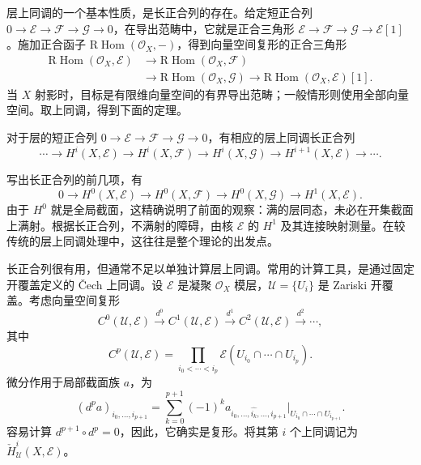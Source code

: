 层上同调的一个基本性质，是长正合列的存在。给定短正合列 $0\to\mathcal{E}\to\mathcal{F}\to\mathcal{G}\to0$，在导出范畴中，它就是正合三角形 $\mathcal{E}\to\mathcal{F}\to\mathcal{G}\to\mathcal{E}[1]$。施加正合函子 $\mathrm{R}\operatorname{Hom}(\mathcal{O}_X,-)$，得到向量空间复形的正合三角形
\[
\begin{aligned}
\mathrm{R}\operatorname{Hom}(\mathcal{O}_X,\mathcal{E})
&\longrightarrow\mathrm{R}\operatorname{Hom}(\mathcal{O}_X,\mathcal{F})\\
&\longrightarrow\mathrm{R}\operatorname{Hom}(\mathcal{O}_X,\mathcal{G})
\longrightarrow\mathrm{R}\operatorname{Hom}(\mathcal{O}_X,\mathcal{E})[1].
\end{aligned}
\]
当 $X$ 射影时，目标是有限维向量空间的有界导出范畴；一般情形则使用全部向量空间。取上同调，得到下面的定理。

\begin{theorem}\label{thm:4.62}
对于层的短正合列 $0\to\mathcal{E}\to\mathcal{F}\to\mathcal{G}\to0$，有相应的层上同调长正合列
\[
\cdots\longrightarrow H^i(X,\mathcal{E})\longrightarrow H^i(X,\mathcal{F})
\longrightarrow H^i(X,\mathcal{G})\longrightarrow H^{i+1}(X,\mathcal{E})
\longrightarrow\cdots.
\]
\end{theorem}

\begin{note}[63]\label{note:4.63}
写出长正合列的前几项，有
\[
0\longrightarrow H^0(X,\mathcal{E})\longrightarrow H^0(X,\mathcal{F})
\longrightarrow H^0(X,\mathcal{G})\longrightarrow H^1(X,\mathcal{E}).
\]
由于 $H^0$ 就是全局截面，这精确说明了前面的观察：满的层同态，未必在开集截面上满射。根据长正合列，不满射的障碍，由核 $\mathcal{E}$ 的 $H^1$ 及其连接映射测量。在较传统的层上同调处理中，这往往是整个理论的出发点。
\end{note}

长正合列很有用，但通常不足以单独计算层上同调。常用的计算工具，是通过固定开覆盖定义的 \v Cech 上同调。设 $\mathcal{E}$ 是凝聚 $\mathcal{O}_X$ 模层，$\mathcal{U}=\{U_i\}$ 是 Zariski 开覆盖。考虑向量空间复形
\[
C^0(\mathcal{U},\mathcal{E})\xrightarrow{d^0}C^1(\mathcal{U},\mathcal{E})
\xrightarrow{d^1}C^2(\mathcal{U},\mathcal{E})\xrightarrow{d^2}\cdots,
\]
其中
\[
C^p(\mathcal{U},\mathcal{E})
=\prod_{i_0<\cdots<i_p}\mathcal{E}(U_{i_0}\cap\cdots\cap U_{i_p}).
\]
微分作用于局部截面族 $a$，为
\[
(d^pa)_{i_0,\ldots,i_{p+1}}
=\sum_{k=0}^{p+1}(-1)^k
a_{i_0,\ldots,\widehat{i_k},\ldots,i_{p+1}}
\big|_{U_{i_0}\cap\cdots\cap U_{i_{p+1}}}.
\]
容易计算 $d^{p+1}\circ d^p=0$，因此，它确实是复形。将其第 $i$ 个上同调记为 $\check H^i_{\mathcal{U}}(X,\mathcal{E})$。

